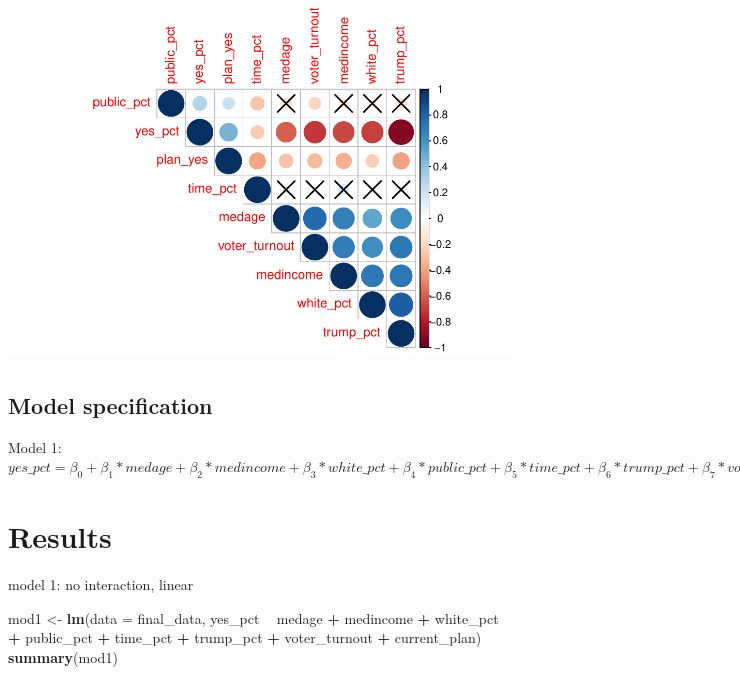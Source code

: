 \documentclass[
]{article}
\newenvironment{Shaded}{\begin{snugshade}}{\end{snugshade}}
\newcommand{\DataTypeTok}[1]{\textcolor[rgb]{0.13,0.29,0.53}{#1}}
\newcommand{\KeywordTok}[1]{\textcolor[rgb]{0.13,0.29,0.53}{\textbf{#1}}}
\newcommand{\NormalTok}[1]{#1}
\newcommand{\OperatorTok}[1]{\textcolor[rgb]{0.81,0.36,0.00}{\textbf{#1}}}
\newcommand{\StringTok}[1]{\textcolor[rgb]{0.31,0.60,0.02}{#1}}
\begin{document}
\includegraphics{Zhong_paper_files/figure-latex/unnamed-chunk-1-1.pdf}

\hypertarget{model-specification}{%
\subsection{Model specification}\label{model-specification}}

Model 1:
\(yes\_pct = \beta_0+\beta_1*medage+\beta_2*medincome+\beta_3*white\_pct+\beta_4*public\_pct+\beta_5*time\_pct+\beta_6*trump\_pct+\beta_7*voter\_turnout+\beta_8*current\_plan+\epsilon\)

\hypertarget{results}{%
\section{Results}\label{results}}

model 1: no interaction, linear

\begin{Shaded}
\begin{Highlighting}[]
\NormalTok{mod1 <-}\StringTok{ }\KeywordTok{lm}\NormalTok{(}\DataTypeTok{data =}\NormalTok{ final_data, yes_pct }\OperatorTok{~}\StringTok{ }\NormalTok{medage }\OperatorTok{+}\StringTok{ }\NormalTok{medincome }\OperatorTok{+}\StringTok{ }\NormalTok{white_pct }
           \OperatorTok{+}\StringTok{ }\NormalTok{public_pct }\OperatorTok{+}\StringTok{ }\NormalTok{time_pct }\OperatorTok{+}\StringTok{ }\NormalTok{trump_pct }\OperatorTok{+}\StringTok{ }\NormalTok{voter_turnout }\OperatorTok{+}
\StringTok{              }\NormalTok{current_plan)}
\KeywordTok{summary}\NormalTok{(mod1)}
\end{Highlighting}
\end{Shaded}
\end{document}
